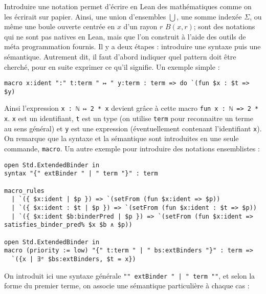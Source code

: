 \documentclass[a4paper, 12pt]{article}
\newcommand{\lean}[1]{\texttt{#1}}
\begin{document}
Introduire une notation permet d'écrire en Lean des mathématiques comme on les écrirait sur papier. Ainsi, une union d'ensembles $\bigcup$, une somme indexée $\Sigma$, ou même une boule ouverte centrée en $x$ d'un rayon $r$ $B(x, r)$; sont des notations qui ne sont pas natives en Lean, mais que l'on construit à l'aide des outils de méta programmation fournis. Il y a deux étapes : introduire une syntaxe puis une sémantique. Autrement dit, il faut d'abord indiquer quel pattern doit être cherché, pour en suite exprimer ce qu'il signifie. Un exemple simple :

\begin{verbatim}
macro x:ident ":" t:term " ↦ " y:term : term => do `(fun $x : $t => $y)
\end{verbatim}

Ainsi l'expression \lean{x : ℕ ↦ 2 * x} devient grâce à cette macro \lean{fun x : ℕ => 2 * x}. \lean{x} est un identifiant, \lean{t} est un type (on utilise \lean{term} pour reconnaitre un terme au sens général) et \lean{y} est une expression (éventuellement contenant l'identifiant \lean{x}). On remarque que la syntaxe et la sémantique sont introduites en une seule commande, \lean{macro}. Un autre exemple pour introduire des notations ensemblistes :

\begin{verbatim}
open Std.ExtendedBinder in
syntax "{" extBinder " | " term "}" : term

macro_rules
  | `({ $x:ident | $p }) => `(setFrom (fun $x:ident => $p))
  | `({ $x:ident : $t | $p }) => `(setFrom (fun $x:ident : $t => $p))
  | `({ $x:ident $b:binderPred | $p }) => `(setFrom (fun $x:ident => satisfies_binder_pred% $x $b ∧ $p))

open Std.ExtendedBinder in
macro (priority := low) "{" t:term " | " bs:extBinders "}" : term =>
  `({x | ∃ᵉ $bs:extBinders, $t = x})
\end{verbatim}

On introduit ici une syntaxe générale \lean{"{" extBinder " | " term "}"}, et selon la forme du premier terme, on associe une sémantique particulière à chaque cas :
\end{document}

